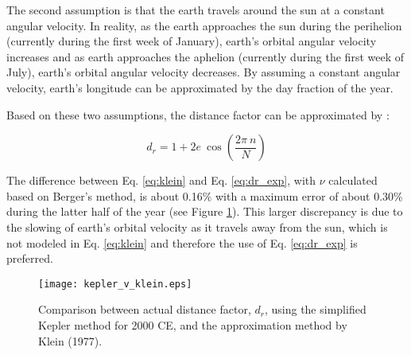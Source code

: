 The second assumption is that the earth travels around the sun at a constant angular velocity. 
In reality, as the earth approaches the sun during the perihelion (currently during the first week of January), earth's orbital angular velocity increases and as earth approaches the aphelion (currently during the first week of July), earth's orbital angular velocity decreases. 
By assuming a constant angular velocity, earth's longitude can be approximated by the day fraction of the year.

Based on these two assumptions, the distance factor can be approximated by \parencite{klein77}:

\begin{equation}
\label{eq:klein}
    d_r = 1 + 2 e \: \cos \left( \frac{2 \pi \: n}{N} \right)
\end{equation}

The difference between Eq. \ref{eq:klein} and Eq. \ref{eq:dr_exp}, with $\nu$ calculated based on Berger's method, is about 0.16\% with a maximum error of about 0.30\% during the latter half of the year (see Figure \ref{fig:klein}). 
This larger discrepancy is due to the slowing of earth's orbital velocity as it travels away from the sun, which is not modeled in Eq. \ref{eq:klein} and therefore the use of Eq. \ref{eq:dr_exp} is preferred.\\

\begin{figure}[ht!]
    \texttt{[image: kepler\_v\_klein.eps]}
    \caption{Comparison between actual distance factor, $d_r$, using the simplified Kepler method for 2000 CE, and the approximation method by Klein (1977).}
    \label{fig:klein}
\end{figure}

